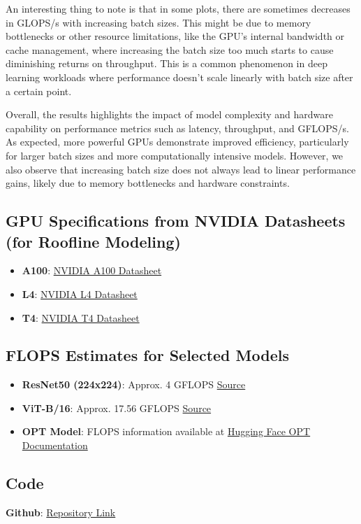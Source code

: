 \documentclass[11pt]{article}
\begin{document}
An interesting thing to note is that in some plots, there are sometimes decreases in GLOPS/s with increasing batch sizes. This might be due to memory bottlenecks or other resource limitations, like the GPU's internal bandwidth or cache management, where increasing the batch size too much starts to cause diminishing returns on throughput. This is a common phenomenon in deep learning workloads where performance doesn’t scale linearly with batch size after a certain point.

Overall, the results highlights the impact of model complexity and hardware capability on performance metrics such as latency, throughput, and GFLOPS/s. As expected, more powerful GPUs demonstrate improved efficiency, particularly for larger batch sizes and more computationally intensive models. However, we also observe that increasing batch size does not always lead to linear performance gains, likely due to memory bottlenecks and hardware constraints.




\subsection*{GPU Specifications from NVIDIA Datasheets (for Roofline Modeling)}
\begin{itemize}
    \item \textbf{A100}: \href{https://www.nvidia.com/content/dam/en-zz/Solutions/Data-Center/a100/pdf/nvidia-a100-datasheet.pdf}{NVIDIA A100 Datasheet}
    \item \textbf{L4}: \href{https://resources.nvidia.com/en-us-data-center-overview/l4-gpu-datasheet}{NVIDIA L4 Datasheet}
    \item \textbf{T4}: \href{https://www.nvidia.com/content/dam/en-zz/Solutions/Data-Center/tesla-t4/t4-tensor-core-datasheet-951643.pdf}{NVIDIA T4 Datasheet}
\end{itemize}

\subsection*{FLOPS Estimates for Selected Models}
\begin{itemize}
    \item \textbf{ResNet50 (224x224)}: Approx. 4 GFLOPS  
    \href{https://github.com/albanie/convnet-burden}{Source}
    \item \textbf{ViT-B/16}: Approx. 17.56 GFLOPS  
    \href{https://pytorch.org/vision/main/models/generated/torchvision.models.vit_b_16.html}{Source}
    \item \textbf{OPT Model}: FLOPS information available at  
    \href{https://huggingface.co/docs/transformers/en/model_doc/opt}{Hugging Face OPT Documentation}
\end{itemize}

\subsection*{Code} \textbf{Github}: 
    \href{https://github.com/kentjliu/acml-project1}{Repository Link}
\end{document}
